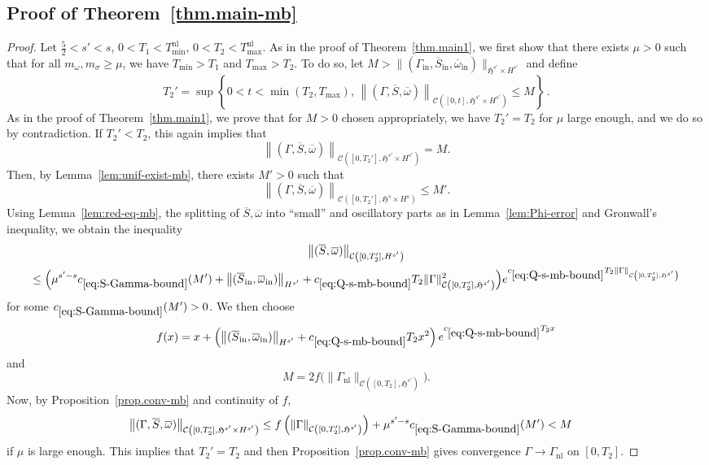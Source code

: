 \documentclass[10pt]{amsart}
\theoremstyle{definition}\newtheorem{defi}[theo]{Definition}\newtheorem{rema}[theo]{Remark}\newtheorem{exam}[theo]{Example}\newtheorem{exem}[theo]{Example}\newtheorem{nota}[theo]{Notation}
\newcommand{\rmin}{\mathrm{in}}
\newcommand{\nl}{\mathrm{nl}}
\newcommand{\cC}{\mathcal{C}}
\newcommand{\gH}{\mathfrak{H}}
\begin{document}
\subsection*{Proof of Theorem~\ref{thm.main-mb}}
\begin{proof}
Let $\tfrac52 <s'<s$, $0<T_1<T_{\min}^{\nl}$, $0<T_2<T_{\max}^{\nl}$. As in the proof of Theorem~\ref{thm.main1}, we first show that there exists $\mu>0$ such that for all $m_\omega,m_\sigma\geq \mu$, we have $T_{\min}>T_1$ and $T_{\max}>T_2$. To do so, let $M>\|(\Gamma_{\rmin}, \overline{S}_\rmin, \overline{\omega}_\rmin)\|_{\gH^{s'}\times H^{s'}}$ and define
\[
T_2' = \sup\left\{0<t<\min(T_2,T_{\max}),\,\left\|(\Gamma,\overline{S}, \overline{\omega})\right\|_{\cC\left([0,t], \gH^{s'}\times H^{s'}\right)}\leq M\right\}\,.
\]
As in the proof of Theorem~\ref{thm.main1}, we prove that for $M>0$ chosen appropriately, we have $T_2'=T_2$ for $\mu$ large enough, and we do so by contradiction. If $T_2'<T_2$, this again implies that
\[
\left\|(\Gamma,\overline{S}, \overline{\omega})\right\|_{\cC\left([0,T_2'],\gH^{s'}\times H^{s'}\right)}=M.
\]
Then, by Lemma~\ref{lem:unif-exist-mb}, there exists $M'>0$ such that
\begin{equation}
\left\|(\Gamma, \overline{S}, \overline{\omega})\right\|_{\cC\left([0,T_2'],\gH^s\times H^s\right)} \leq M'.
\end{equation}
Using Lemma~\ref{lem:red-eq-mb}, the splitting of $\overline{S}, \overline{\omega}$ into ``small'' and oscillatory parts as in Lemma~\ref{lem:Phi-error} and Gronwall's inequality, we obtain the inequality
\begin{multline}\label{eq:S-Gamma-bound}
\left\|(\overline{S},\overline{\omega})\right\|_{\cC\left([0,T_2'],H^{s'}\right)}\\
\leq \Big(\mu^{s'-s}c_{\eqref{eq:S-Gamma-bound}}(M') + \left\|(\overline{S}_\rmin,\overline{\omega}_\rmin)\right\|_{H^{s'}} + c_{\eqref{eq:Q-s-mb-bound}} T_2 \|\Gamma\|_{\cC\left([0,T_2'],\gH^{s'}\right)}^2 \Big) e^{c_{\eqref{eq:Q-s-mb-bound}} T_2 \|\Gamma\|_{\cC\left([0,T_2'],\gH^{s'}\right)}}
\end{multline}
for some $c_{\eqref{eq:S-Gamma-bound}}(M')>0$. We then choose
\begin{equation}
f(x)=x+ \left(\left\|(\overline{S}_\rmin,\overline{\omega}_\rmin)\right\|_{H^{s'}} + c_{\eqref{eq:Q-s-mb-bound}} T_2x^2\right)e^{c_{\eqref{eq:Q-s-mb-bound}} T_2 x}
\end{equation}
and
\begin{equation}
M=2 f\big(\|\Gamma_\nl\|_{\cC\left([0,T_2],\gH^{s'}\right)}\big).
\end{equation}
Now, by Proposition~\ref{prop.conv-mb} and continuity of $f$,
\begin{align*}
\left\|(\Gamma,\overline{S}, \overline{\omega})\right\|_{\cC\left([0,T_2'],\gH^{s'}\times H^{s'}\right)} &\leq f\left(\|\Gamma\|_{\cC\left([0,T_2'],\gH^{s'}\right)}\right) + \mu^{s'-s}c_{\eqref{eq:S-Gamma-bound}}(M')<M
\end{align*}
if $\mu$ is large enough. This implies that $T_2'=T_2$ and then Proposition~\ref{prop.conv-mb} gives convergence $\Gamma\to \Gamma_\nl$ on $[0,T_2]$.
\end{proof}
\end{document}
